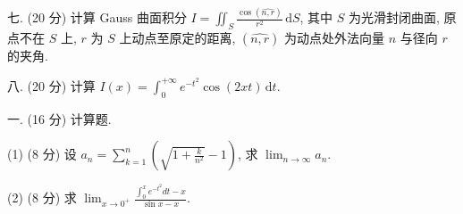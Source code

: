 \documentclass{examcollection}
\begin{document}
{\begin{minipage}{\textwidth}
七. (20 分) 计算 Gauss 曲面积分 $I = \iint_{S} \frac{\cos(\widehat{n,r})}{r^2} \, \mathrm{d}S$, 其中 $S$ 为光滑封闭曲面, 原点不在 $S$ 上, $r$ 为 $S$ 上动点至原定的距离, $(\widehat{n,r})$ 为动点处外法向量 $n$ 与径向 $r$ 的夹角.\par
八. (20 分) 计算 $I(x) = \int_{0}^{+\infty} e^{-t^2} \cos(2xt) \, \mathrm{d}t$.\par
{}\smallskip
一. (16 分) 计算题.\par
(1) (8 分) 设 $a_{n} = \sum_{k=1}^{n}\left(\sqrt{1 + \frac{k}{n^{2}}} - 1\right)$, 求 $\lim_{n \to \infty} a_{n}$.\par
(2) (8 分) 求  $\lim_{x\to0^{+}}\frac{\int_{0}^{x}e^{-t^{2}}dt-x}{\sin x-x}.$\par
\end{minipage}}
\ifdim\dimexpr\ht\proofbox+\dp\proofbox\relax>\textheight
\noindent\resizebox{!}{\textheight}{\usebox{\proofbox}}\else\noindent\usebox{\proofbox}\fi\clearpage
\end{document}
